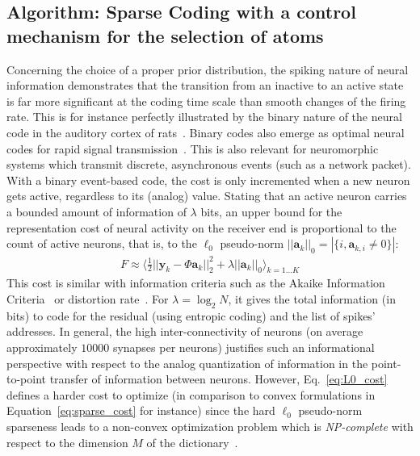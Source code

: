 \documentclass[letterpaper,final,conference,10pt]{IEEEtran}
\newcommand{\citep}[1]{\cite{#1}}
\newcommand{\coef}{\mathbf{a}} %
\newcommand{\image}{\mathbf{y}} %
\newcommand{\dico}{\Phi} %
\newcommand{\enscond}[2]{\lbrace #1, #2 \rbrace}
\newcommand{\norm}[1]{|\!| #1 |\!|}
\newcommand{\abs}[1]{\left|#1\right|}
\newcommand{\seeEq}[1]{Eq.~\ref{eq:#1}}%
\begin{document}
\subsection{Algorithm: Sparse Coding with a control mechanism for the selection of atoms}
Concerning the choice of a proper prior distribution, the spiking nature of neural information demonstrates that the transition from an inactive to an active state is far more significant at the coding time scale than smooth changes of the firing rate. This is for instance perfectly illustrated by the binary nature of the neural code in the auditory cortex of rats~\citep{DeWeese03}. Binary codes also emerge as optimal neural codes for rapid signal transmission~\citep{Bethge03}. This is also relevant for neuromorphic systems which transmit discrete, asynchronous events (such as a network packet). With a binary event-based code, the cost is only incremented when a new neuron gets active, regardless to its (analog) value. Stating that an active neuron carries a bounded amount of information of $\lambda$ bits, an upper bound for the representation cost of neural activity on the receiver end is proportional to the count of active neurons, that is, to the $\ell_0$ pseudo-norm $\norm{\coef_{k}}_0 = \abs{\enscond{i}{\coef_{k, i} \neq 0}}$:%
\begin{align}%
F \approx   \langle \frac{1}{2} \norm{\image_k - \dico \coef_{k}}_2^2 + \lambda\norm{\coef_{k}}_0 \rangle_{k = 1 \ldots K}%
\label{eq:L0_cost}%
\end{align}%
This cost is similar with information criteria such as the Akaike Information Criteria~\citep{Akaike74} or distortion rate~\cite[p.~571]{Mallat98}. For $\lambda=\log_2 N$, it gives the total information (in bits) to code for the residual (using entropic coding) and the list of spikes' addresses. In general, the high inter-connectivity of neurons (on average approximately $10000$ synapses per neurons) justifies such an informational perspective with respect to the analog quantization of information in the point-to-point transfer of information between neurons.
However, \seeEq{L0_cost} defines a harder cost to optimize (in comparison to convex formulations in Equation~\ref{eq:sparse_cost} for instance) since the hard $\ell_0$ pseudo-norm sparseness leads to a non-convex optimization problem which is \emph{NP-complete} with respect to the dimension $M$ of the dictionary~\cite[p.~418]{Mallat98}.
\end{document}
